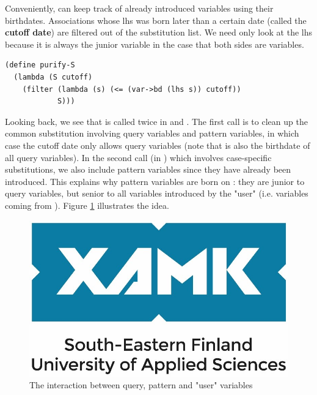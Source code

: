 Conveniently,  can keep track of already introduced variables using their birthdates. Associations whose lhs was born later than a certain date (called the \textbf{cutoff date}) are filtered out of the substitution list. We need only look at the lhs because it is always the junior variable in the case that both sides are variables.
\begin{lstlisting}
(define purify-S
  (lambda (S cutoff)
    (filter (lambda (s) (<= (var->bd (lhs s)) cutoff))
            S)))
\end{lstlisting}

Looking back, we see that  is called twice in  and . The first call is to clean up the common substitution involving query variables and pattern variables, in which case the cutoff date only allows query variables (note that  is also the birthdate of all query variables). In the second call (in ) which involves case-specific substitutions, we also include pattern variables since they have already been introduced. This explains why pattern variables are born on : they are junior to query variables, but senior to all variables introduced by the "user" (i.e. variables coming from ). Figure \ref{fig:au_S} illustrates the idea.
\begin{figure}[h]
    \centering
    \includegraphics{figures/logo.jpg}
    \caption{The interaction between query, pattern and "user" variables}
    \label{fig:au_S}
\end{figure}


